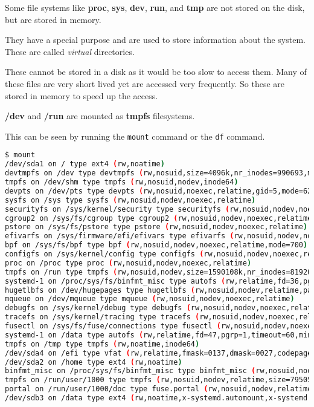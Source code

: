 Some file systems like \textbf{proc}, \textbf{sys}, \textbf{dev}, \textbf{run}, and \textbf{tmp} are not stored on the disk, but are stored in memory.

They have a special purpose and are used to store information about the system.
These are called \textit{virtual} directories.

These cannot be stored in a disk as it would be too slow to access them.
Many of these files are very short lived yet are accessed very frequently.
So these are stored in memory to speed up the access.

\textbf{/dev} and \textbf{/run} are mounted as \textbf{tmpfs} filesystems.

This can be seen by running the \lstinline|mount| command or the \lstinline|df| command.

\begin{lstlisting}[language=bash]
  $ mount
/dev/sda1 on / type ext4 (rw,noatime)
devtmpfs on /dev type devtmpfs (rw,nosuid,size=4096k,nr_inodes=990693,mode=755,inode64)
tmpfs on /dev/shm type tmpfs (rw,nosuid,nodev,inode64)
devpts on /dev/pts type devpts (rw,nosuid,noexec,relatime,gid=5,mode=620,ptmxmode=000)
sysfs on /sys type sysfs (rw,nosuid,nodev,noexec,relatime)
securityfs on /sys/kernel/security type securityfs (rw,nosuid,nodev,noexec,relatime)
cgroup2 on /sys/fs/cgroup type cgroup2 (rw,nosuid,nodev,noexec,relatime,nsdelegate,memory_recursiveprot)
pstore on /sys/fs/pstore type pstore (rw,nosuid,nodev,noexec,relatime)
efivarfs on /sys/firmware/efi/efivars type efivarfs (rw,nosuid,nodev,noexec,relatime)
bpf on /sys/fs/bpf type bpf (rw,nosuid,nodev,noexec,relatime,mode=700)
configfs on /sys/kernel/config type configfs (rw,nosuid,nodev,noexec,relatime)
proc on /proc type proc (rw,nosuid,nodev,noexec,relatime)
tmpfs on /run type tmpfs (rw,nosuid,nodev,size=1590108k,nr_inodes=819200,mode=755,inode64)
systemd-1 on /proc/sys/fs/binfmt_misc type autofs (rw,relatime,fd=36,pgrp=1,timeout=0,minproto=5,maxproto=5,direct,pipe_ino=5327)
hugetlbfs on /dev/hugepages type hugetlbfs (rw,nosuid,nodev,relatime,pagesize=2M)
mqueue on /dev/mqueue type mqueue (rw,nosuid,nodev,noexec,relatime)
debugfs on /sys/kernel/debug type debugfs (rw,nosuid,nodev,noexec,relatime)
tracefs on /sys/kernel/tracing type tracefs (rw,nosuid,nodev,noexec,relatime)
fusectl on /sys/fs/fuse/connections type fusectl (rw,nosuid,nodev,noexec,relatime)
systemd-1 on /data type autofs (rw,relatime,fd=47,pgrp=1,timeout=60,minproto=5,maxproto=5,direct,pipe_ino=2930)
tmpfs on /tmp type tmpfs (rw,noatime,inode64)
/dev/sda4 on /efi type vfat (rw,relatime,fmask=0137,dmask=0027,codepage=437,iocharset=ascii,shortname=mixed,utf8,errors=remount-ro)
/dev/sda2 on /home type ext4 (rw,noatime)
binfmt_misc on /proc/sys/fs/binfmt_misc type binfmt_misc (rw,nosuid,nodev,noexec,relatime)
tmpfs on /run/user/1000 type tmpfs (rw,nosuid,nodev,relatime,size=795052k,nr_inodes=198763,mode=700,uid=1000,gid=1001,inode64)
portal on /run/user/1000/doc type fuse.portal (rw,nosuid,nodev,relatime,user_id=1000,group_id=1001)
/dev/sdb3 on /data type ext4 (rw,noatime,x-systemd.automount,x-systemd.idle-timeout=1min)
\end{lstlisting}


